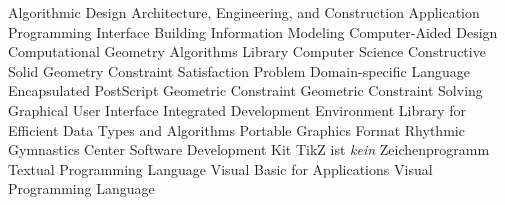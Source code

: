 \begin{acronym}[B-Rep]
     {Algorithmic Design}
    {Architecture, Engineering, and Construction}
    {Application Programming Interface}
    {Building Information Modeling}
    {Computer-Aided Design}
   {Computational Geometry Algorithms Library}
     {Computer Science}
    {Constructive Solid Geometry}
    {Constraint Satisfaction Problem}
    {Domain-specific Language}
    {Encapsulated PostScript}
     {Geometric Constraint}
    {Geometric Constraint Solving}
    {Graphical User Interface}
    {Integrated Development Environment}
   {Library for Efficient Data Types and Algorithms}
    {Portable Graphics Format}
    {Rhythmic Gymnastics Center}
    {Software Development Kit}
   {TikZ ist \textit{kein} Zeichenprogramm}
    {Textual Programming Language}
    {Visual Basic for Applications}
    {Visual Programming Language}
\end{acronym}
